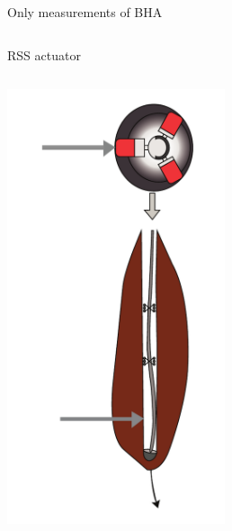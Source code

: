\documentclass{beamer}
\begin{document}
\begin{frame}
\begin{columns}[T]
\begin{column}{0.5\textwidth}
\begin{itemize}
\begin{figure}
				\end{figure}
				Only measurements of BHA
			\end{itemize}
		\end{column}
	\end{columns}
\end{frame}

\begin{frame}{RSS actuator}
	\begin{columns}[T]
			\begin{column}{0.5\textwidth}
			\hspace{2cm}	\includegraphics[width=0.5\textwidth]{images/RSSForce0.pdf}
			\end{column}
			\begin{column}{0.5\textwidth}

\end{column}
\end{columns}
\end{frame}
\end{document}
